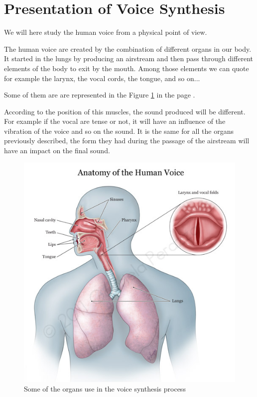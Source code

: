 \documentclass[12pt]{report}
\begin{document}
\section{Presentation of Voice Synthesis}
We will here study the human voice from a physical point of view.

The human voice are created by the combination of different organs in our body.
It started in the lungs by producing an airstream and then pass through different elements of the body to exit by the mouth. Among those elements we can quote for example the larynx, the vocal cords, the tongue, and so on...

Some of them are are represented in the Figure \ref{ImageHumanVoice} in the page \pageref{ImageHumanVoice}.


According to the position of this muscles, the sound produced will be different. For example if the vocal are tense or not, it will have an influence of the vibration of the voice and so on the sound. It is the same for all the organs previously described, the form they had during the passage of the airstream will have an impact on the final sound.

\begin{figure}
\begin{center}
\includegraphics[scale=0.5]{resources/human_voice.jpg} 
\end{center}
\caption{Some of the organs use in the voice synthesis process}
\label{ImageHumanVoice}
\end{figure}
\end{document}
